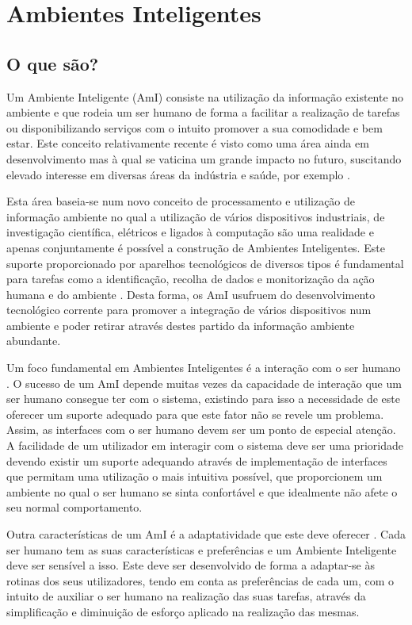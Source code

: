 \chapter{Ambientes Inteligentes}

\section{O que são?}

Um Ambiente Inteligente (AmI) \cite{ducatel2001scenarios, ducatel2003ambient} consiste na utilização da informação existente no ambiente e que rodeia um ser humano de forma a facilitar a realização de tarefas ou disponibilizando serviços com o intuito promover a sua comodidade e bem estar. Este conceito relativamente recente é visto como uma área ainda em desenvolvimento mas à qual se vaticina um grande impacto no futuro, suscitando elevado interesse em diversas áreas da indústria e saúde, por exemplo \cite{aarts2006into}.

Esta área baseia-se num novo conceito de processamento e utilização de informação ambiente no qual a utilização de vários dispositivos industriais, de investigação científica, elétricos e ligados à computação são uma realidade e apenas conjuntamente é possível a construção de Ambientes Inteligentes. Este suporte proporcionado por aparelhos tecnológicos de diversos tipos é fundamental para tarefas como a identificação, recolha de dados e monitorização da ação humana e do ambiente \cite{ducatel2001scenarios}. Desta forma, os AmI usufruem do desenvolvimento tecnológico corrente para promover a integração de vários dispositivos num ambiente e poder retirar através destes partido da informação ambiente abundante.

Um foco fundamental em Ambientes Inteligentes é a interação com o ser humano \cite{aarts2006into}. O sucesso de um AmI depende muitas vezes da capacidade de interação que um ser humano consegue ter com o sistema, existindo para isso a necessidade de este oferecer um suporte adequado para que este fator não se revele um problema. Assim, as interfaces com o ser humano devem ser um ponto de especial atenção. A facilidade de um utilizador em interagir com o sistema deve ser uma prioridade devendo existir um suporte adequando através de implementação de interfaces que permitam uma utilização o mais intuitiva possível, que proporcionem um ambiente no qual o ser humano se sinta confortável e que idealmente não afete o seu normal comportamento.

Outra características de um AmI é a adaptatividade que este deve oferecer \cite{aarts2006into}. Cada ser humano tem as suas características e preferências e um Ambiente Inteligente deve ser sensível a isso. Este deve ser desenvolvido de forma a adaptar-se às rotinas dos seus utilizadores, tendo em conta as preferências de cada um, com o intuito de auxiliar o ser humano na realização das suas tarefas, através da simplificação e diminuição de esforço aplicado na realização das mesmas.

